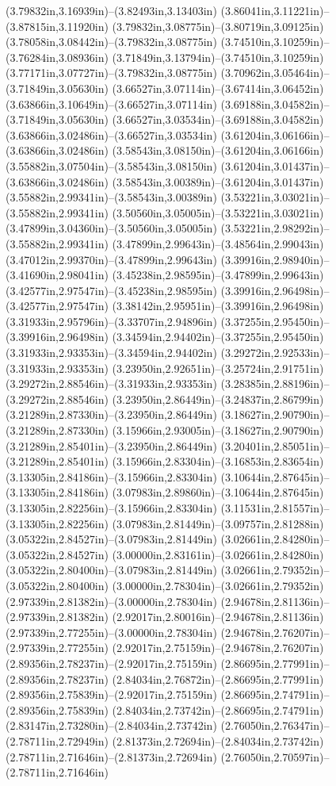 (3.79832in,3.16939in)--(3.82493in,3.13403in) (3.86041in,3.11221in)--(3.87815in,3.11920in) (3.79832in,3.08775in)--(3.80719in,3.09125in) (3.78058in,3.08442in)--(3.79832in,3.08775in) (3.74510in,3.10259in)--(3.76284in,3.08936in) (3.71849in,3.13794in)--(3.74510in,3.10259in) (3.77171in,3.07727in)--(3.79832in,3.08775in) (3.70962in,3.05464in)--(3.71849in,3.05630in) (3.66527in,3.07114in)--(3.67414in,3.06452in) (3.63866in,3.10649in)--(3.66527in,3.07114in) (3.69188in,3.04582in)--(3.71849in,3.05630in) (3.66527in,3.03534in)--(3.69188in,3.04582in) (3.63866in,3.02486in)--(3.66527in,3.03534in) (3.61204in,3.06166in)--(3.63866in,3.02486in) (3.58543in,3.08150in)--(3.61204in,3.06166in) (3.55882in,3.07504in)--(3.58543in,3.08150in) (3.61204in,3.01437in)--(3.63866in,3.02486in) (3.58543in,3.00389in)--(3.61204in,3.01437in) (3.55882in,2.99341in)--(3.58543in,3.00389in) (3.53221in,3.03021in)--(3.55882in,2.99341in) (3.50560in,3.05005in)--(3.53221in,3.03021in) (3.47899in,3.04360in)--(3.50560in,3.05005in) (3.53221in,2.98292in)--(3.55882in,2.99341in) (3.47899in,2.99643in)--(3.48564in,2.99043in) (3.47012in,2.99370in)--(3.47899in,2.99643in) (3.39916in,2.98940in)--(3.41690in,2.98041in) (3.45238in,2.98595in)--(3.47899in,2.99643in) (3.42577in,2.97547in)--(3.45238in,2.98595in) (3.39916in,2.96498in)--(3.42577in,2.97547in) (3.38142in,2.95951in)--(3.39916in,2.96498in) (3.31933in,2.95796in)--(3.33707in,2.94896in) (3.37255in,2.95450in)--(3.39916in,2.96498in) (3.34594in,2.94402in)--(3.37255in,2.95450in) (3.31933in,2.93353in)--(3.34594in,2.94402in) (3.29272in,2.92533in)--(3.31933in,2.93353in) (3.23950in,2.92651in)--(3.25724in,2.91751in) (3.29272in,2.88546in)--(3.31933in,2.93353in) (3.28385in,2.88196in)--(3.29272in,2.88546in) (3.23950in,2.86449in)--(3.24837in,2.86799in) (3.21289in,2.87330in)--(3.23950in,2.86449in) (3.18627in,2.90790in)--(3.21289in,2.87330in) (3.15966in,2.93005in)--(3.18627in,2.90790in) (3.21289in,2.85401in)--(3.23950in,2.86449in) (3.20401in,2.85051in)--(3.21289in,2.85401in) (3.15966in,2.83304in)--(3.16853in,2.83654in) (3.13305in,2.84186in)--(3.15966in,2.83304in) (3.10644in,2.87645in)--(3.13305in,2.84186in) (3.07983in,2.89860in)--(3.10644in,2.87645in) (3.13305in,2.82256in)--(3.15966in,2.83304in) (3.11531in,2.81557in)--(3.13305in,2.82256in) (3.07983in,2.81449in)--(3.09757in,2.81288in) (3.05322in,2.84527in)--(3.07983in,2.81449in) (3.02661in,2.84280in)--(3.05322in,2.84527in) (3.00000in,2.83161in)--(3.02661in,2.84280in) (3.05322in,2.80400in)--(3.07983in,2.81449in) (3.02661in,2.79352in)--(3.05322in,2.80400in) (3.00000in,2.78304in)--(3.02661in,2.79352in) (2.97339in,2.81382in)--(3.00000in,2.78304in) (2.94678in,2.81136in)--(2.97339in,2.81382in) (2.92017in,2.80016in)--(2.94678in,2.81136in) (2.97339in,2.77255in)--(3.00000in,2.78304in) (2.94678in,2.76207in)--(2.97339in,2.77255in) (2.92017in,2.75159in)--(2.94678in,2.76207in) (2.89356in,2.78237in)--(2.92017in,2.75159in) (2.86695in,2.77991in)--(2.89356in,2.78237in) (2.84034in,2.76872in)--(2.86695in,2.77991in) (2.89356in,2.75839in)--(2.92017in,2.75159in) (2.86695in,2.74791in)--(2.89356in,2.75839in) (2.84034in,2.73742in)--(2.86695in,2.74791in) (2.83147in,2.73280in)--(2.84034in,2.73742in) (2.76050in,2.76347in)--(2.78711in,2.72949in) (2.81373in,2.72694in)--(2.84034in,2.73742in) (2.78711in,2.71646in)--(2.81373in,2.72694in) (2.76050in,2.70597in)--(2.78711in,2.71646in) 